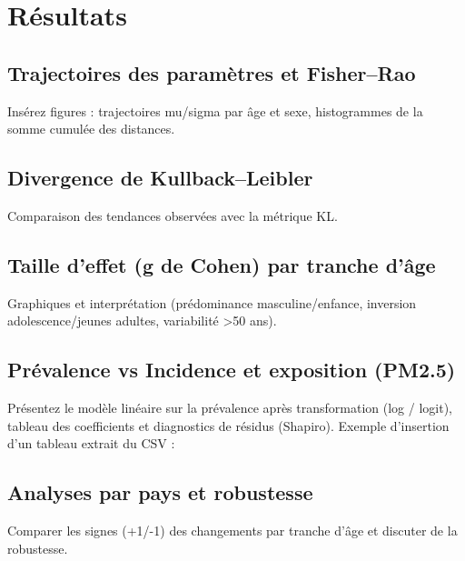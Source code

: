 \chapter{Résultats}
\label{chap:results}
\section{Trajectoires des paramètres et Fisher--Rao}
Insérez figures : trajectoires mu/sigma par âge et sexe, histogrammes de la somme cumulée des distances.


\section{Divergence de Kullback--Leibler}
Comparaison des tendances observées avec la métrique KL.


\section{Taille d'effet (g de Cohen) par tranche d'âge}
Graphiques et interprétation (prédominance masculine/enfance, inversion adolescence/jeunes adultes, variabilité >50 ans).


\section{Prévalence vs Incidence et exposition (PM2.5)}
Présentez le modèle linéaire sur la prévalence après transformation (log / logit), tableau des coefficients et diagnostics de résidus (Shapiro). Exemple d'insertion d'un tableau extrait du CSV :


\section{Analyses par pays et robustesse}
Comparer les signes (+1/-1) des changements par tranche d'âge et discuter de la robustesse.